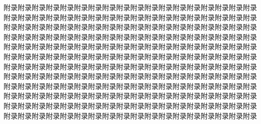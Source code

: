 附录附录附录附录附录附录附录附录附录附录附录附录附录附录附录附录附录附录附录附录附录附录附录附录附录附录附录附录附录附录附录附录附录附录附录附录附录附录附录附录附录附录附录附录附录附录附录附录附录附录附录附录附录附录附录附录附录附录附录附录附录附录附录附录附录附录附录附录附录附录附录附录附录附录附录附录附录附录附录附录附录附录附录附录附录附录附录附录附录附录附录附录附录附录附录附录附录附录附录附录附录附录附录附录附录附录附录附录附录附录附录附录附录附录附录附录附录附录附录附录附录附录附录附录附录附录附录附录附录附录附录附录附录附录附录附录附录附录附录附录附录附录附录附录附录附录附录附录附录附录附录附录附录附录附录附录附录附录附录附录附录附录附录附录附录附录附录附录附录附录附录附录附录附录附录附录附录附录附录附录附录附录附录附录附录附录附录附录附录附录附录附录附录附录附录附录附录附录附录附录附录附录附录附录附录附录附录附录附录附录附录附录附录附录附录附录

\clearpage
\endinput